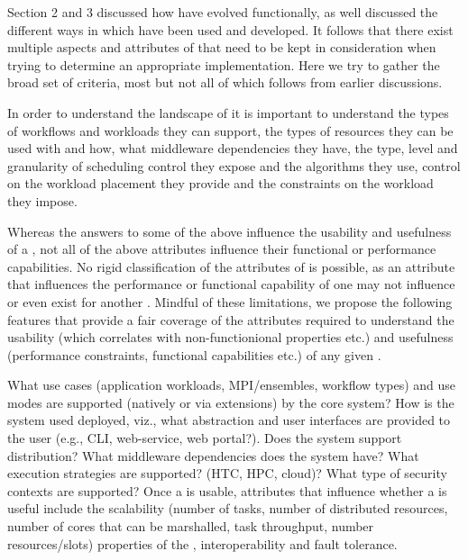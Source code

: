 \documentclass{sig-alternate}
\begin{document}


Section 2 and 3 discussed how \pilotjobs have evolved functionally, as
well discussed the different ways in which \pilotjobs have been
used and developed. It follows that there exist multiple aspects and
attributes of \pilotjobs that need to be kept in consideration when
trying to determine an appropriate implementation.  Here we try to
gather the broad set of criteria, most but not all of which follows
from earlier discussions.

In order to understand the landscape of \pilotjobs it is important to
understand the types of workflows and workloads they can support, the
types of resources they can be used with and how, what middleware
dependencies they have, the type, level and granularity of scheduling
control they expose and the algorithms they use, control on the
workload placement they provide and the
constraints on the workload they impose. 

Whereas the answers to some of the above influence the usability and
usefulness of a \pilotjob, not all of the above attributes influence
their functional or performance capabilities.  No rigid classification
of the attributes of \pilotjobs is possible, as an attribute that
influences the performance or functional capability of one \pilotjob
may not influence or even exist for another \pilotjob. Mindful of
these limitations, we propose the following features that provide a
fair coverage of the attributes required to understand the usability
(which correlates with non-functionional properties etc.)  and
usefulness (performance constraints, functional capabilities etc.)  of
any given \pilotjob.

What use cases (application workloads, MPI/ensembles, workflow types)
and use modes are supported (natively or via extensions) by the core
\pilotjob system?  How is the \pilotjob system used deployed, viz.,
what abstraction and user interfaces are provided to the user (e.g.,
CLI, web-service, web portal?). Does the \pilotjob system support
distribution? What middleware dependencies does the \pilotjob system
have?  What execution strategies are supported? (HTC, HPC, cloud)?
What type of security contexts are supported?  Once a \pilotjob is
usable, attributes that influence whether a \pilotjob is useful include
the scalability (number of tasks, number of distributed resources,
number of cores that can be marshalled, task throughput, number
resources/slots) properties of the \pilotjob, interoperability and
fault tolerance.
\end{document}
